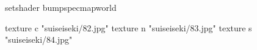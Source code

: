 setshader bumpspecmapworld

    texture c "suiseiseki/82.jpg"
    texture n "suiseiseki/83.jpg"
    texture s "suiseiseki/84.jpg"
